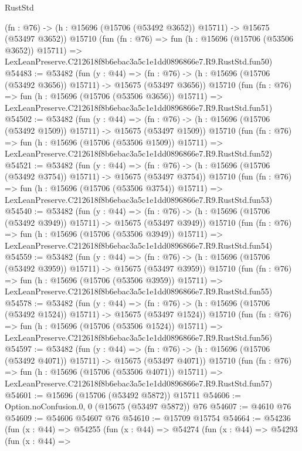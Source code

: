 \begin{lexlean}{RustStd}
\begin{coremodule}
    (fn : @76) -> (h : @15696 (@15706 (@53492 @3652)) @15711) -> @15675 (@53497 @3652))
    @15710
    (fun (fn : @76) =>
    fun (h : @15696 (@15706 (@53506 @3652)) @15711) =>
    LexLeanPreserve.C212618f8b6ebac3a5c1e1dd0896866e7.R9.RustStd.fun50)
@54483 := @53482
    (fun (y : @44) =>
    (fn : @76) -> (h : @15696 (@15706 (@53492 @3656)) @15711) -> @15675 (@53497 @3656))
    @15710
    (fun (fn : @76) =>
    fun (h : @15696 (@15706 (@53506 @3656)) @15711) =>
    LexLeanPreserve.C212618f8b6ebac3a5c1e1dd0896866e7.R9.RustStd.fun51)
@54502 := @53482
    (fun (y : @44) =>
    (fn : @76) -> (h : @15696 (@15706 (@53492 @1509)) @15711) -> @15675 (@53497 @1509))
    @15710
    (fun (fn : @76) =>
    fun (h : @15696 (@15706 (@53506 @1509)) @15711) =>
    LexLeanPreserve.C212618f8b6ebac3a5c1e1dd0896866e7.R9.RustStd.fun52)
@54521 := @53482
    (fun (y : @44) =>
    (fn : @76) -> (h : @15696 (@15706 (@53492 @3754)) @15711) -> @15675 (@53497 @3754))
    @15710
    (fun (fn : @76) =>
    fun (h : @15696 (@15706 (@53506 @3754)) @15711) =>
    LexLeanPreserve.C212618f8b6ebac3a5c1e1dd0896866e7.R9.RustStd.fun53)
@54540 := @53482
    (fun (y : @44) =>
    (fn : @76) -> (h : @15696 (@15706 (@53492 @3949)) @15711) -> @15675 (@53497 @3949))
    @15710
    (fun (fn : @76) =>
    fun (h : @15696 (@15706 (@53506 @3949)) @15711) =>
    LexLeanPreserve.C212618f8b6ebac3a5c1e1dd0896866e7.R9.RustStd.fun54)
@54559 := @53482
    (fun (y : @44) =>
    (fn : @76) -> (h : @15696 (@15706 (@53492 @3959)) @15711) -> @15675 (@53497 @3959))
    @15710
    (fun (fn : @76) =>
    fun (h : @15696 (@15706 (@53506 @3959)) @15711) =>
    LexLeanPreserve.C212618f8b6ebac3a5c1e1dd0896866e7.R9.RustStd.fun55)
@54578 := @53482
    (fun (y : @44) =>
    (fn : @76) -> (h : @15696 (@15706 (@53492 @1524)) @15711) -> @15675 (@53497 @1524))
    @15710
    (fun (fn : @76) =>
    fun (h : @15696 (@15706 (@53506 @1524)) @15711) =>
    LexLeanPreserve.C212618f8b6ebac3a5c1e1dd0896866e7.R9.RustStd.fun56)
@54597 := @53482
    (fun (y : @44) =>
    (fn : @76) -> (h : @15696 (@15706 (@53492 @4071)) @15711) -> @15675 (@53497 @4071))
    @15710
    (fun (fn : @76) =>
    fun (h : @15696 (@15706 (@53506 @4071)) @15711) =>
    LexLeanPreserve.C212618f8b6ebac3a5c1e1dd0896866e7.R9.RustStd.fun57)
@54601 := @15696 (@15706 (@53492 @5872)) @15711
@54606 := Option.noConfusion.{0, 0} (@15675 (@53497 @5872)) @76
@54607 := @4610 @76
@54609 := @54606 @54607 @76
@54610 := @15709 @15754
@54664 := @54236
    (fun (x : @44) =>
    @54255
      (fun (x : @44) =>
      @54274
        (fun (x : @44) =>
        @54293
          (fun (x : @44) =>

\end{coremodule}
\end{lexlean}
